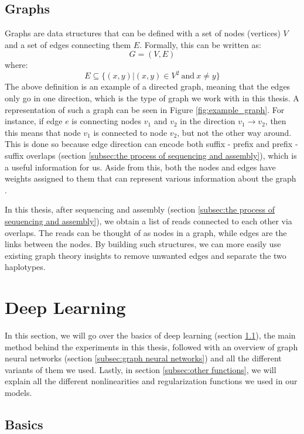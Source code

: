 \documentclass[times, utf8, diplomski, english]{fer_eng}
\begin{document}
\subsection{Graphs}

Graphs are data structures that can be defined with a set of nodes (vertices) $V$ and a set of edges connecting them $E$. Formally, this can be written as:
\[ G = (V, E) \]
where:
\[ E \subseteq 	\{ (x, y)|(x, y) \in V^2 \mathrm{\ and\ } x \neq y \} \]
The above definition is an example of a directed graph, meaning that the edges only go in one direction, which is the type of graph we work with in this thesis. A representation of such a graph can be seen in Figure \ref{fig:example_graph}. For instance, if edge $e$ is connecting nodes $v_1$ and $v_2$ in the direction $v_1 \rightarrow v_2$, then this means that node $v_1$ is connected to node $v_2$, but not the other way around. This is done so because edge direction can encode both suffix - prefix and prefix - suffix overlaps (section \ref{subsec:the process of sequencing and assembly}), which is a useful information for us. Aside from this, both the nodes and edges have weights assigned to them that can represent various information about the graph \cite{trudeau_2017}.

In this thesis, after sequencing and assembly (section \ref{subsec:the process of sequencing and assembly}), we obtain a list of reads connected to each other via overlaps. The reads can be thought of as nodes in a graph, while edges are the links between the nodes. By building such structures, we can more easily use existing graph theory insights to remove unwanted edges and separate the two haplotypes.

\section{Deep Learning}

In this section, we will go over the basics of deep learning (section \ref{subsec:basics}), the main method behind the experiments in this thesis, followed with an overview of graph neural networks (section \ref{subsec:graph neural networks}) and all the different variants of them we used. Lastly, in section \ref{subsec:other functions}, we will explain all the different nonlinearities and regularization functions we used in our models.

\subsection{Basics}
\label{subsec:basics}
\end{document}
